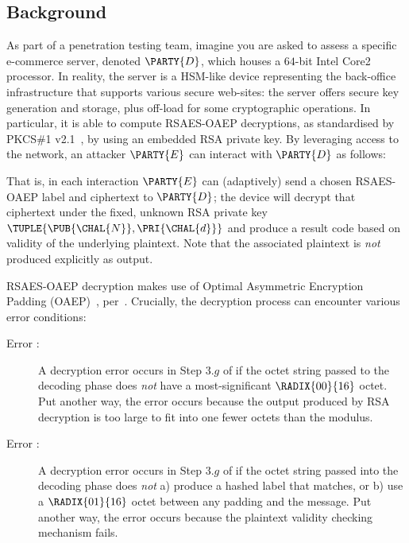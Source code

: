 \documentclass[crop={false},multi={true},tikz={true}]{standalone}
\begin{document}

\subsection{Background}

As part of a penetration testing team, imagine you are asked to assess a 
specific e-commerce server, denoted $\PARTY{D}$, which houses a $64$-bit
Intel Core2 processor.  
In reality, the server is a HSM-like device representing the back-office 
infrastructure that supports various secure web-sites: the server offers
secure key generation and storage, plus off-load for some cryptographic 
operations.  In particular, it is able to compute RSAES-OAEP decryptions, 
as standardised by PKCS\#1 v2.1~\cite{SCALE:RFC:3447}, by using an 
embedded RSA private key.
By leveraging access to the network, 
an attacker $\PARTY{E}$ can interact with $\PARTY{D}$ as follows:

\begin{center}

\end{center}

\noindent
That is, in each interaction $\PARTY{E}$ can (adaptively) send 
a chosen RSAES-OAEP label and ciphertext
to $\PARTY{D}$; the device will
decrypt that ciphertext under the fixed, unknown RSA private key $\TUPLE{ \PUB{\CHAL{N}}, \PRI{\CHAL{d}} }$ 
and produce 
a result code based on validity of the underlying  plaintext.
Note that the associated  plaintext is {\em not} produced explicitly as
output.

RSAES-OAEP decryption makes use of Optimal Asymmetric Encryption Padding 
(OAEP)~\cite{SCALE:BelRog:94}, per~\cite[Section 7.1]{SCALE:RFC:3447}.  
Crucially, the decryption process can encounter various error conditions:

\begin{description}
\item[Error :]
     A decryption error occurs in Step $3.g$ of  
     if the octet string passed to the decoding phase
     does {\em not} have a most-significant $\RADIX{00}{16}$ octet.
     Put another way, the error occurs because 
     the output produced by RSA decryption is too large to fit into one 
     fewer octets than the modulus.

\item[Error :]
     A decryption error occurs in Step $3.g$ of  
     if the octet string passed into the decoding phase 
     does {\em not} a) produce a hashed label that matches, or b) use a
     $\RADIX{01}{16}$ octet between any padding and the message.
     Put another way, the error occurs because 
     the plaintext validity checking mechanism fails.
\end{description}
\end{document}
